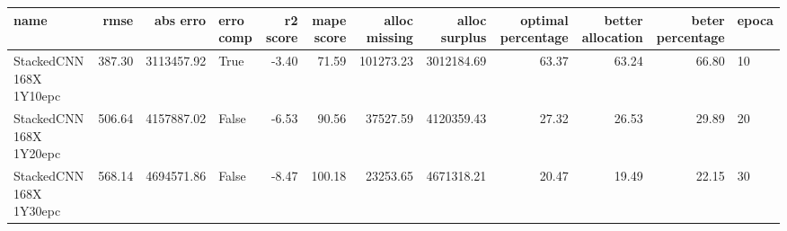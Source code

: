 \begin{tabular}{lrrlrrrrrrrl}
\toprule
name & rmse & abs erro & erro comp & r2 score & mape score & alloc missing & alloc surplus & optimal percentage & better allocation & beter percentage & epoca \\
\midrule
StackedCNN 168X 1Y10epc & 387.30 & 3113457.92 & True & -3.40 & 71.59 & 101273.23 & 3012184.69 & 63.37 & 63.24 & 66.80 & 10 \\
StackedCNN 168X 1Y20epc & 506.64 & 4157887.02 & False & -6.53 & 90.56 & 37527.59 & 4120359.43 & 27.32 & 26.53 & 29.89 & 20 \\
StackedCNN 168X 1Y30epc & 568.14 & 4694571.86 & False & -8.47 & 100.18 & 23253.65 & 4671318.21 & 20.47 & 19.49 & 22.15 & 30 \\
\bottomrule
\end{tabular}
